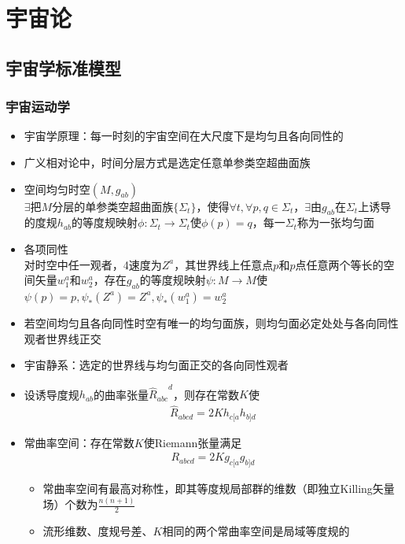 \chapter{宇宙论}

\section{宇宙学标准模型}

\subsection{宇宙运动学}

\begin{itemize}
    \item 宇宙学原理：每一时刻的宇宙空间在大尺度下是均匀且各向同性的
    \item 广义相对论中，时间分层方式是选定任意单参类空超曲面族
    \item 空间均匀时空$(M, g_{ab})$\\
    $\exists$把$M$分层的单参类空超曲面族$\{\Sigma_t\}$，使得$\forall t, \forall p,q \in \Sigma_t$，$\exists$由$g_{ab}$在$\Sigma_t$上诱导的度规$h_{ab}$的等度规映射$\phi:\Sigma_t \to \Sigma_t$使$\phi(p)=q$，每一$\Sigma_t$称为一张均匀面
    \item 各项同性\\
    对时空中任一观者，4速度为$Z^a$，其世界线上任意点$p$和$p$点任意两个等长的空间矢量$w_1^a$和$w_2^a$，存在$g_{ab}$的等度规映射$\psi:M \to M$使$\psi(p)=p, \psi_{*}(Z^a)=Z^a, \psi_{*}(w_1^a)=w_2^a$
    \item 若空间均匀且各向同性时空有唯一的均匀面族，则均匀面必定处处与各向同性观者世界线正交
    \item 宇宙静系：选定的世界线与均匀面正交的各向同性观者
    \item 设诱导度规$h_{ab}$的曲率张量${\hat{R}_{abc}}^d$，则存在常数$K$使
    \begin{gather*}
        \hat{R}_{abcd}=2Kh_{c[a}h_{b]d}
    \end{gather*}
    \item 常曲率空间：存在常数$K$使Riemann张量满足
    \begin{gather*}
        R_{abcd}=2Kg_{c[a}g_{b]d}
    \end{gather*}
    \begin{itemize}
        \item 常曲率空间有最高对称性，即其等度规局部群的维数（即独立Killing矢量场）个数为$\frac{n(n+1)}{2}$
        \item 流形维数、度规号差、$K$相同的两个常曲率空间是局域等度规的

\end{itemize}
\end{itemize}

